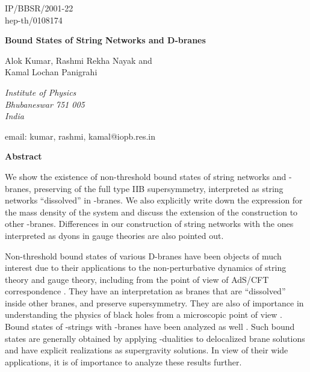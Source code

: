 \documentclass[a4paper,12pt]{article}
\begin{document}
\topmargin 0pt
\oddsidemargin 0mm

\renewcommand{\thefootnote}{\fnsymbol{footnote}}
\begin{titlepage}
\begin{flushright}
IP/BBSR/2001-22\\
hep-th/0108174
\end{flushright}

\vspace{5mm}
\begin{center}
{\Large \bf Bound States of String Networks and D-branes}
\vspace{6mm}

{\large
Alok Kumar, Rashmi Rekha Nayak and\\
Kamal Lochan Panigrahi}\\
\vspace{5mm}
{\em Institute of Physics\\ 
Bhubaneswar 751 005\\ India\\
\vspace{3mm}

email: kumar, rashmi, kamal@iopb.res.in}

\end{center}
\vspace{5mm}
\centerline{{\bf{Abstract}}}
\vspace{5mm}
We show the existence of non-threshold bound states of  
\coordHE{} string networks and \coordHE{}-branes, preserving \coordHE{} 
of the full type IIB supersymmetry, interpreted as string 
networks ``dissolved'' in \coordHE{}-branes. 
We also explicitly write down the expression 
for the mass density of the system and discuss the extension 
of the construction to other \coordHE{}-branes. 
Differences in our construction of string networks with the ones
interpreted as dyons in \coordHE{} gauge theories are also pointed out. 


\end{titlepage}


\newpage
Non-threshold bound states of various D-branes 
\cite{witten,myers} 
have been objects of much interest due to 
their applications to the non-perturbative dynamics of string
theory and gauge theory, including from the point of view of AdS/CFT 
correspondence \cite{malda-russo,oz}. They have an
interpretation as branes that are ``dissolved'' inside other branes,
and preserve \coordHE{} supersymmetry. 
They are also of importance in understanding 
the physics of black holes from a microscopic point of 
view \cite{maldacena}. Bound states of 
\coordHE{}-strings with \coordHE{}-branes have been analyzed as well 
\cite{russo-tsey,costa}. 
Such bound states are generally obtained by applying 
\coordHE{}-dualities \cite{pol} to delocalized brane solutions and have explicit
realizations as supergravity solutions. In view of their wide 
applications, it is of importance to analyze these results
further. 
\end{document}
